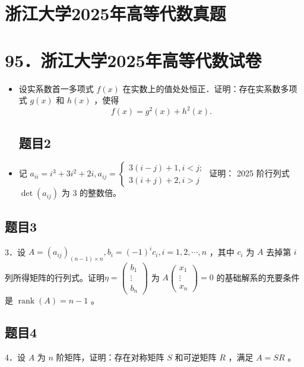 \documentclass{article}
\begin{document}
\section*{浙江大学2025年高等代数真题}
\section*{95．浙江大学2025年高等代数试卷}
\begin{itemize}

\subsection{题目1}
  \item[1．] 设实系数首一多项式 \(f(x)\) 在实数上的值处处恒正．证明：存在实系数多项式 \(g(x)\) 和 \(h(x)\) ，使得
\[
f(x)=g^{2}(x)+h^{2}(x) .
\]

\subsection{题目2}
  \item[2．] 记 \(a_{i i}=i^{3}+3 i^{2}+2 i, a_{i j}=\left\{\begin{array}{l}3(i-j)+1, i<j ; \\ 3(i+j)+2, i>j\end{array}\right.\) 证明： 2025 阶行列式 \(\operatorname{det}\left(a_{i j}\right)\) 为 3 的整数倍。
\end{itemize}

\subsection{题目3}
3．设 \(A=\left(a_{i j}\right)_{(n-1) \times n}, b_{i}=(-1)^{i} c_{i}, i=1,2, \cdots, n\) ，其中 \(c_{i}\) 为 \(A\) 去掉第 \(i\) 列所得矩阵的行列式。证明\(\eta=\left(\begin{array}{c}b_{1} \\ \vdots \\ b_{n}\end{array}\right)\) 为 \(A\left(\begin{array}{c}x_{1} \\ \vdots \\ x_{n}\end{array}\right)=0\) 的基础解系的充要条件是 \(\operatorname{rank}(A)=n-1\) 。

\subsection{题目4}
4．设 \(A\) 为 \(n\) 阶矩阵，证明：存在对称矩阵 \(S\) 和可逆矩阵 \(R\) ，满足 \(A=S R\) 。
\end{document}
